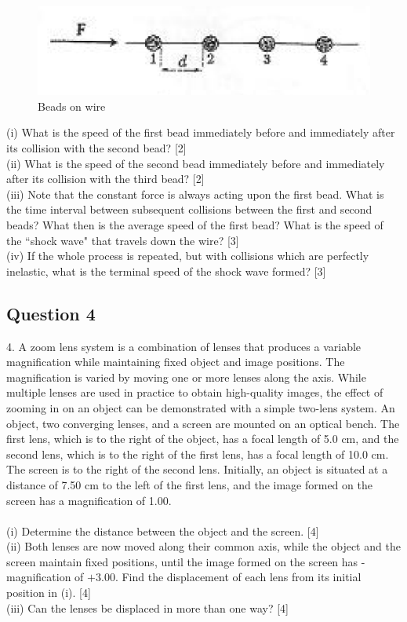 \documentclass{article}
\begin{document}
\begin{figure}
	\centering
	\includegraphics[width=0.7\linewidth]{spho_book_TYS_images/2011q3.png}
	\caption{Beads on wire}
\end{figure}

(i) What is the speed of the first bead immediately before and immediately after its collision with the second bead? [2] \\
(ii) What is the speed of the second bead immediately before and immediately after its collision with the third bead? [2] \\
(iii) Note that the constant force is always acting upon the first bead. What is the time interval between subsequent collisions between the first and second beads? What then is the average speed of the first bead? What is the speed of the “shock wave" that travels down the wire? [3] \\
(iv) If the whole process is repeated, but with collisions which are perfectly inelastic, what is the terminal speed of the shock wave formed? [3] \\


\subsection{Question 4}
4. A zoom lens system is a combination of lenses that produces a variable magnification while maintaining fixed object and image positions. The magnification is varied by moving one or more lenses along the axis. While multiple lenses are used in practice to obtain high-quality images, the effect of zooming in on an object can be demonstrated with a simple two-lens system. An object, two converging lenses, and a screen are mounted on an optical bench. The first lens, which is to the right of the object, has a focal length of 5.0 cm, and the second lens, which is to the right of the first lens, has a focal length of 10.0 cm. The screen is to the right of the second lens. Initially, an object is situated at a distance of 7.50 cm to the left of the first lens, and the image formed on the screen has a magnification of 1.00. \\
\\
(i) Determine the distance between the object and the screen. [4] \\
(ii) Both lenses are now moved along their common axis, while the object and the screen maintain fixed positions, until the image formed on the screen has - magnification of $+3.00$. Find the displacement of each lens from its initial position in (i). [4] \\
(iii) Can the lenses be displaced in more than one way? [4] \\
\end{document}
